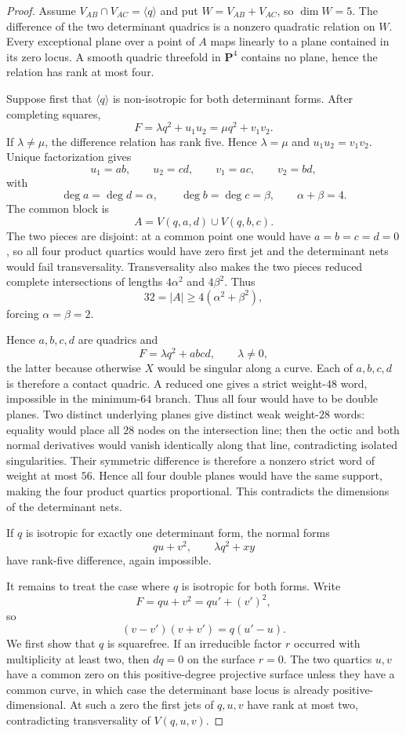\documentclass[11pt,reqno]{amsart}
\theoremstyle{remark}
\newcommand{\PP}{\mathbf P}
\begin{document}
\begin{proof}
Assume $V_{AB}\cap V_{AC}=\langle q\rangle$ and put $W=V_{AB}+V_{AC}$, so $\dim W=5$.  The difference of the two determinant quadrics is a nonzero quadratic relation on $W$.  Every exceptional plane over a point of $A$ maps linearly to a plane contained in its zero locus.  A smooth quadric threefold in $\PP^4$ contains no plane, hence the relation has rank at most four.

Suppose first that $\langle q\rangle$ is non-isotropic for both determinant forms.  After completing squares,
\[
F=\lambda q^2+u_1u_2=\mu q^2+v_1v_2.
\]
If $\lambda\ne\mu$, the difference relation has rank five.  Hence $\lambda=\mu$ and $u_1u_2=v_1v_2$.  Unique factorization gives
\[
u_1=ab,\qquad u_2=cd,\qquad v_1=ac,\qquad v_2=bd,
\]
with
\[
\deg a=\deg d=\alpha,
\qquad
\deg b=\deg c=\beta,
\qquad
\alpha+\beta=4.
\]
The common block is
\[
A=V(q,a,d)\cup V(q,b,c).
\]
The two pieces are disjoint: at a common point one would have $a=b=c=d=0$, so all four product quartics would have zero first jet and the determinant nets would fail transversality.  Transversality also makes the two pieces reduced complete intersections of lengths $4\alpha^2$ and $4\beta^2$.  Thus
\[
32=|A|\ge4(\alpha^2+\beta^2),
\]
forcing $\alpha=\beta=2$.

Hence $a,b,c,d$ are quadrics and
\[
F=\lambda q^2+abcd,
\qquad \lambda\ne0,
\]
the latter because otherwise $X$ would be singular along a curve.  Each of $a,b,c,d$ is therefore a contact quadric.  A reduced one gives a strict weight-$48$ word, impossible in the minimum-$64$ branch.  Thus all four would have to be double planes.  Two distinct underlying planes give distinct weak weight-$28$ words: equality would place all $28$ nodes on the intersection line; then the octic and both normal derivatives would vanish identically along that line, contradicting isolated singularities.  Their symmetric difference is therefore a nonzero strict word of weight at most $56$.  Hence all four double planes would have the same support, making the four product quartics proportional.  This contradicts the dimensions of the determinant nets.

If $q$ is isotropic for exactly one determinant form, the normal forms
\[
qu+v^2,
\qquad
\lambda q^2+xy
\]
have rank-five difference, again impossible.

It remains to treat the case where $q$ is isotropic for both forms.  Write
\[
F=qu+v^2=qu'+(v')^2,
\]
so
\[
(v-v')(v+v')=q(u'-u). \tag{K1}
\]
We first show that $q$ is squarefree.  If an irreducible factor $r$ occurred with multiplicity at least two, then $dq=0$ on the surface $r=0$.  The two quartics $u,v$ have a common zero on this positive-degree projective surface unless they have a common curve, in which case the determinant base locus is already positive-dimensional.  At such a zero the first jets of $q,u,v$ have rank at most two, contradicting transversality of $V(q,u,v)$.


\end{proof}
\end{document}
